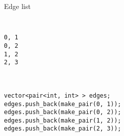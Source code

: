 \documentclass[12pt,t]{beamer}
\begin{document}
\begin{frame}[fragile]{Edge list}

    \begin{columns}[T]
        \begin{column}{.4\textwidth}
            \begin{verbatim}

0, 1
0, 2
1, 2
2, 3



vector<pair<int, int> > edges;
edges.push_back(make_pair(0, 1));
edges.push_back(make_pair(0, 2));
edges.push_back(make_pair(1, 2));
edges.push_back(make_pair(2, 3));
            \end{verbatim}
        \end{column}%
        \hfill%
        \begin{column}{.4\textwidth}
            \begin{figure}
            \end{figure}
        \end{column}%
    \end{columns}
\end{frame}
\end{document}

